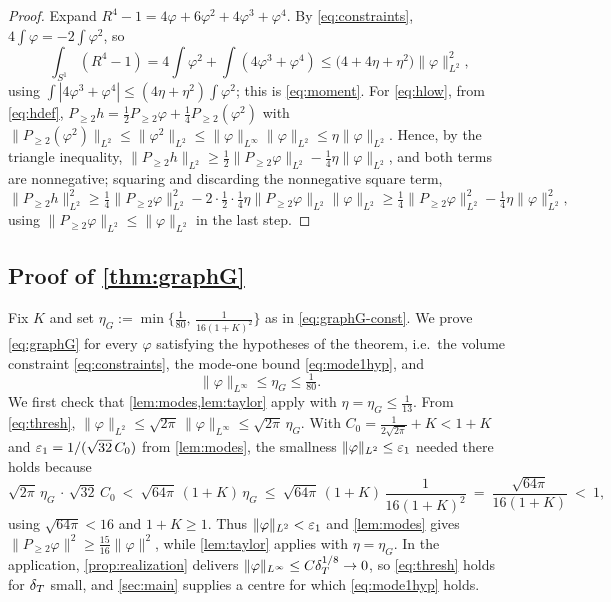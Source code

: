 \begin{proof}
Expand $R^4-1=4\varphi+6\varphi^2+4\varphi^3+\varphi^4$. By
\eqref{eq:constraints}, $4\int\varphi=-2\int\varphi^2$, so
\[
   \int_{S^1}(R^4-1)=4\int\varphi^2+\int(4\varphi^3+\varphi^4)
   \le\bigl(4+4\eta+\eta^2\bigr)\|\varphi\|_{L^2}^2,
\]
using $\int|4\varphi^3+\varphi^4|\le(4\eta+\eta^2)\int\varphi^2$; this is
\eqref{eq:moment}. For \eqref{eq:hlow}, from \eqref{eq:hdef},
$P_{\ge2}h=\tfrac12P_{\ge2}\varphi+\tfrac14P_{\ge2}(\varphi^2)$ with
$\|P_{\ge2}(\varphi^2)\|_{L^2}\le\|\varphi^2\|_{L^2}\le\|\varphi\|_{L^\infty}
\|\varphi\|_{L^2}\le\eta\|\varphi\|_{L^2}$. Hence, by the triangle inequality,
$\|P_{\ge2}h\|_{L^2}\ge\tfrac12\|P_{\ge2}\varphi\|_{L^2}-\tfrac14\eta
\|\varphi\|_{L^2}$, and both terms are nonnegative; squaring and discarding
the nonnegative square term,
\[
   \|P_{\ge2}h\|_{L^2}^2\ge\tfrac14\|P_{\ge2}\varphi\|_{L^2}^2
   -2\cdot\tfrac12\cdot\tfrac14\eta\|P_{\ge2}\varphi\|_{L^2}\|\varphi\|_{L^2}
   \ge\tfrac14\|P_{\ge2}\varphi\|_{L^2}^2-\tfrac14\eta\|\varphi\|_{L^2}^2,
\]
using $\|P_{\ge2}\varphi\|_{L^2}\le\|\varphi\|_{L^2}$ in the last step.
\end{proof}

\subsection{Proof of \texorpdfstring{\cref{thm:graphG}}{the theorem}}

Fix $K$ and set $\eta_G:=\min\{\tfrac1{80},\,\tfrac1{16(1+K)^2}\}$ as in
\eqref{eq:graphG-const}. We prove \eqref{eq:graphG} for every $\varphi$
satisfying the hypotheses of the theorem, i.e.\ the volume constraint
\eqref{eq:constraints}, the mode-one bound \eqref{eq:mode1hyp}, and
\begin{equation}\label{eq:thresh}
   \|\varphi\|_{L^\infty}\le\eta_G\le\tfrac1{80}.
\end{equation}
We first check that \cref{lem:modes,lem:taylor} apply with
$\eta=\eta_G\le\tfrac1{13}$. From \eqref{eq:thresh},
$\|\varphi\|_{L^2}\le\sqrt{2\pi}\,\|\varphi\|_{L^\infty}\le\sqrt{2\pi}\,\eta_G$.
With $C_0=\tfrac1{2\sqrt{2\pi}}+K<1+K$ and
$\varepsilon_1=1/(\sqrt{32}\,C_0)$ from \cref{lem:modes}, the smallness
$\|\varphi\|_{L^2}\le\varepsilon_1$ needed there holds because
\[
   \sqrt{2\pi}\,\eta_G\,\cdot\,\sqrt{32}\,C_0
   \ <\ \sqrt{64\pi}\,(1+K)\,\eta_G
   \ \le\ \sqrt{64\pi}\,(1+K)\,\frac1{16(1+K)^2}
   \ =\ \frac{\sqrt{64\pi}}{16(1+K)}\ <\ 1,
\]
using $\sqrt{64\pi}<16$ and $1+K\ge1$. Thus
$\|\varphi\|_{L^2}<\varepsilon_1$ and \cref{lem:modes} gives
$\|P_{\ge2}\varphi\|^2\ge\tfrac{15}{16}\|\varphi\|^2$, while \cref{lem:taylor}
applies with $\eta=\eta_G$. In the application,
\cref{prop:realization} delivers $\|\varphi\|_{L^\infty}\le C\delta_T^{1/8}\to0$,
so \eqref{eq:thresh} holds for $\delta_T$ small, and \cref{sec:main} supplies a
centre for which \eqref{eq:mode1hyp} holds.

